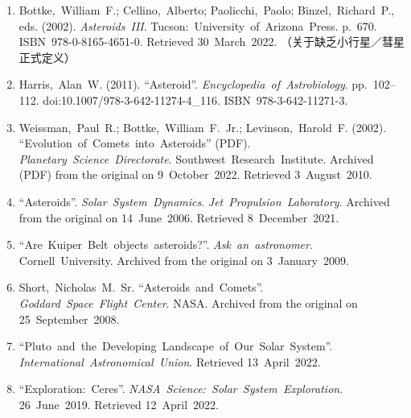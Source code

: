 \begin{enumerate}
\item Bottke,~William~F.; Cellino,~Alberto; Paolicchi,~Paolo; Binzel,~Richard~P., eds. (2002). \textit{Asteroids~III}. Tucson:~University~of~Arizona~Press. p.~670. ISBN~978-0-8165-4651-0. Retrieved 30~March~2022. （关于缺乏小行星／彗星正式定义）
\item Harris,~Alan~W. (2011). ``Asteroid''. \textit{Encyclopedia~of~Astrobiology}. pp.~102–112. doi:10.1007/978-3-642-11274-4\_116. ISBN~978-3-642-11271-3.
\item Weissman,~Paul~R.; Bottke,~William~F.~Jr.; Levinson,~Harold~F. (2002). ``Evolution~of~Comets~into~Asteroids'' (PDF). \textit{Planetary~Science~Directorate}. Southwest~Research~Institute. Archived (PDF) from the original on 9~October~2022. Retrieved 3~August~2010.
\item ``Asteroids''. \textit{Solar~System~Dynamics}. \textit{Jet~Propulsion~Laboratory}. Archived from the original on 14~June~2006. Retrieved 8~December~2021.
\item ``Are~Kuiper~Belt~objects~asteroids?''. \textit{Ask~an~astronomer}. Cornell~University. Archived from the original on 3~January~2009.
\item Short,~Nicholas~M.~Sr. ``Asteroids~and~Comets''. \textit{Goddard~Space~Flight~Center}. NASA. Archived from the original on 25~September~2008.
\item ``Pluto~and~the~Developing~Landscape~of~Our~Solar~System''. \textit{International~Astronomical~Union}. Retrieved 13~April~2022.
\item ``Exploration:~Ceres''. \textit{NASA~Science:~Solar~System~Exploration}. 26~June~2019. Retrieved 12~April~2022.
\end{enumerate}
